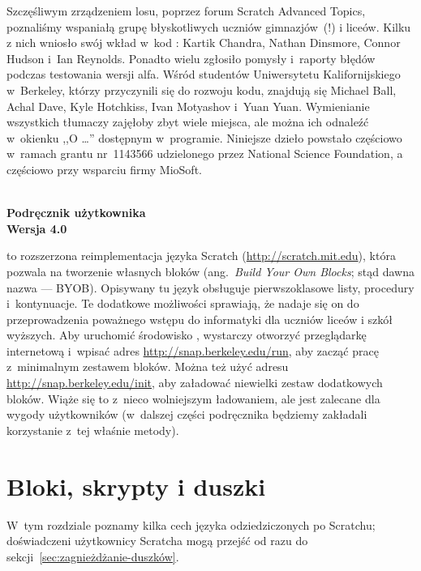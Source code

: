 \documentclass{report}
\begin{document}
Szczęśliwym zrządzeniem losu, poprzez forum Scratch Advanced Topics, poznaliśmy wspaniałą grupę błyskotliwych uczniów gimnazjów~(!\@) i liceów. Kilku z nich wniosło swój wkład w~kod : Kartik Chandra, Nathan Dinsmore, Connor Hudson i~Ian Reynolds. Ponadto wielu zgłosiło pomysły i~raporty błędów podczas testowania wersji alfa. Wśród studentów Uniwersytetu Kalifornijskiego w~Berkeley, którzy przyczynili się do rozwoju kodu, znajdują się Michael Ball, Achal Dave, Kyle Hotchkiss, Ivan Motyashov i~Yuan Yuan. Wymienianie wszystkich tłumaczy zajęłoby zbyt wiele miejsca, ale można ich odnaleźć w~okienku ,,O \Snap{}\ldots'' dostępnym w~programie. Niniejsze dzieło powstało częściowo w~ramach grantu nr~1143566 udzielonego przez National Science Foundation, a częściowo przy wsparciu firmy MioSoft.

\clearpage

\begin{center}
\bf \Huge \Snap{} \\
Podręcznik użytkownika \\
\huge Wersja 4.0 \vspace{40pt}
\end{center}

\Snap{} to rozszerzona reimplementacja języka Scratch (\url{http://scratch.mit.edu}), która pozwala na tworzenie własnych bloków (ang.\ \textit{Build Your Own Blocks}; stąd dawna nazwa  --- BYOB). Opisywany tu język obsługuje pierwszoklasowe listy, procedury i~kontynuacje. Te dodatkowe możliwości sprawiają, że nadaje się on do przeprowadzenia poważnego wstępu do informatyki dla uczniów liceów i szkół wyższych. Aby uruchomić środowisko \Snap{}, wystarczy otworzyć przeglądarkę internetową i~wpisać adres \url{http://snap.berkeley.edu/run}, aby zacząć pracę z~minimalnym zestawem bloków. Można też użyć adresu \url{http://snap.berkeley.edu/init}, aby załadować niewielki zestaw dodatkowych bloków. Wiąże się to z~nieco wolniejszym ładowaniem, ale jest zalecane dla wygody użytkowników (w~dalszej części podręcznika będziemy zakładali korzystanie z~tej właśnie metody).

\clearpage

\chapter{Bloki, skrypty i duszki}

W~tym rozdziale poznamy kilka cech języka \Snap{} odziedziczonych po Scratchu; doświadczeni użytkownicy Scratcha mogą przejść od razu do sekcji~\ref{sec:zagnieżdżanie-duszków}.
\end{document}
